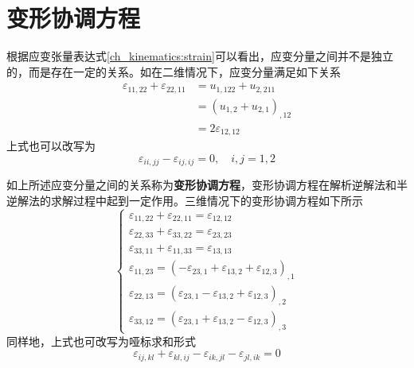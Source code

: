 \section{变形协调方程}
根据应变张量表达式\eqref{ch_kinematics:strain}可以看出，应变分量之间并不是独立的，而是存在一定的关系。如在二维情况下，应变分量满足如下关系
\begin{equation}
\begin{split}
    \varepsilon_{11,22} + \varepsilon_{22,11} &= u_{1,122} + u_{2,211} \\
                                              &= (u_{1,2} + u_{2,1})_{,12} \\
                                              &= 2\varepsilon_{12,12}
\end{split}
\end{equation}
上式也可以改写为
\begin{equation}
    \varepsilon_{ii,jj} - \varepsilon_{ij,ij} = 0,\quad i,j=1,2
\end{equation}\par
如上所述应变分量之间的关系称为\textbf{变形协调方程}，变形协调方程在解析逆解法和半逆解法的求解过程中起到一定作用。三维情况下的变形协调方程如下所示
\begin{equation}
\begin{cases}
    \varepsilon_{11,22} + \varepsilon_{22,11} = \varepsilon_{12,12} \\
    \varepsilon_{22,33} + \varepsilon_{33,22} = \varepsilon_{23,23} \\
    \varepsilon_{33,11} + \varepsilon_{11,33} = \varepsilon_{13,13} \\
    \varepsilon_{11,23} = (- \varepsilon_{23,1} + \varepsilon_{13,2} + \varepsilon_{12,3})_{,1} \\
    \varepsilon_{22,13} = (  \varepsilon_{23,1} - \varepsilon_{13,2} + \varepsilon_{12,3})_{,2} \\
    \varepsilon_{33,12} = (  \varepsilon_{23,1} + \varepsilon_{13,2} - \varepsilon_{12,3})_{,3}
\end{cases}
\end{equation}
同样地，上式也可改写为哑标求和形式
\begin{equation}
    \varepsilon_{ij,kl} + \varepsilon_{kl,ij} - \varepsilon_{ik,jl} - \varepsilon_{jl,ik} = 0
\end{equation}
